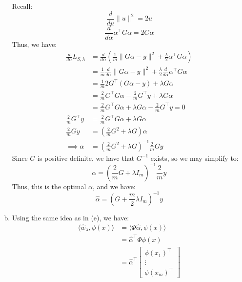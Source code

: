 \documentclass{amsart}
\theoremstyle{definition}
\begin{document}
\begin{enumerate}[(a)]
    Recall:
    \[
    \frac{d}{d u} \|u\|^2 = 2u
    \]
    \[
    \frac{d}{d\alpha} \alpha^\intercal G \alpha = 2G\alpha
    \]
    Thus, we have:
    \begin{align*}
      \frac{d }{d\alpha} L_{S, \lambda} &= \frac{d}{d\alpha} \left(\frac1{m} \|G\alpha - y\|^2 + \displaystyle\frac{\lambda }{2}\alpha^\intercal G \alpha\right)\\
                                        &= \frac1{m} \frac{d}{d\alpha} \|G\alpha - y\|^2 + \displaystyle\frac{\lambda }{2}\frac{d}{d\alpha} \alpha^\intercal G \alpha\\
                                        &= \frac1{m} 2G^\intercal (G\alpha - y) + \lambda G\alpha\\
                                        &= \frac2{m} G^\intercal G\alpha - \frac2{m} G^\intercal y + \lambda G\alpha\\
                                        &= \frac2{m} G^\intercal G\alpha + \lambda G\alpha - \frac2{m} G^\intercal y = 0\\
      \frac2{m} G^\intercal y &=  \frac2{m} G^\intercal G\alpha + \lambda G\alpha  \\
      \frac2{m} G y &= \left(\frac2{m} G^2 + \lambda G\right)\alpha\\
      \implies \alpha &= \left(\frac2{m} G^2 + \lambda G\right)^{-1} \frac2{m} G y
    \end{align*}
    Since $G$ is positive definite, we have that $G^{-1}$ exists, so we may simplify to:
    \[
      \alpha = \left(\frac2{m} G + \lambda I_m\right)^{-1} \frac2{m}  y
      \]
    Thus, this is the optimal $\alpha$, and we have:
    \[
    \hat{\alpha} = \left( G + \frac{m }{2}\lambda I_m\right)^{-1}  y
    \]
    \item 
      Using the same idea as in (e), we have: 
      \begin{align*}
        \langle \hat{w}_\lambda , \phi(x)\rangle &= \langle \Phi \hat{\alpha}, \phi(x)\rangle\\
                                                 &= \hat{\alpha}^\intercal \Phi \phi(x)\\
                                                 &= \hat{\alpha}^\intercal \begin{bmatrix}
                                                  \phi(x_1)^\intercal \\
                                                  \vdots \\
                                                  \phi(x_m)^\intercal

\end{bmatrix}
\end{align*}
\end{enumerate}
\end{document}
